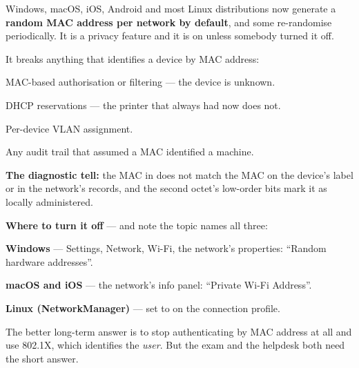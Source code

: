 \begin{alertbox}
Windows, macOS, iOS, Android and most Linux distributions now generate a
\textbf{random MAC address per network by default}, and some re-randomise
periodically. It is a privacy feature and it is on unless somebody turned it off.

It breaks anything that identifies a device by MAC address:

\begin{tight}
  \item MAC-based authorisation or filtering --- the device is unknown.
  \item DHCP reservations --- the printer that always had  now does not.
  \item Per-device VLAN assignment.
  \item Any audit trail that assumed a MAC identified a machine.
\end{tight}

\textbf{The diagnostic tell:} the MAC in  does not match the
MAC on the device's label or in the network's records, and the second octet's
low-order bits mark it as locally administered.

\textbf{Where to turn it off} --- and note the topic names all three:
\begin{tight}
  \item \textbf{Windows} --- Settings, Network, Wi-Fi, the network's properties:
        ``Random hardware addresses''.
  \item \textbf{macOS and iOS} --- the network's info panel: ``Private Wi-Fi
        Address''.
  \item \textbf{Linux (NetworkManager)} ---  set to
         on the connection profile.
\end{tight}

The better long-term answer is to stop authenticating by MAC address at all and
use 802.1X, which identifies the \emph{user}. But the exam and the helpdesk both
need the short answer.
\end{alertbox}

